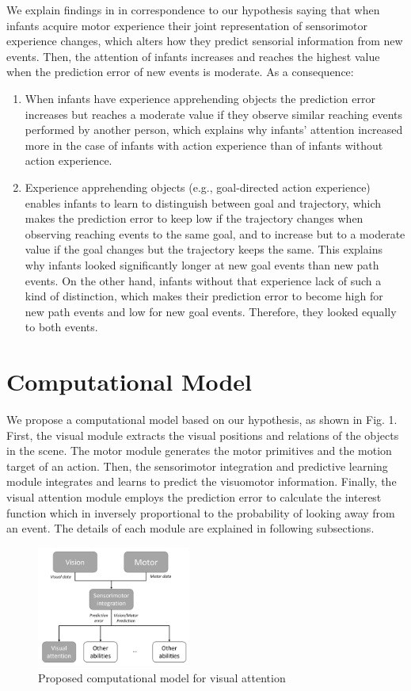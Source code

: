 \documentclass[conference]{IEEEtran}
\begin{document}
We explain findings in \cite{sommerville2005action} in correspondence to our hypothesis saying that when infants acquire motor experience their joint representation of sensorimotor experience changes, which alters how they predict sensorial information from new events. Then, the attention of infants increases and reaches the highest value when the prediction error of new events is moderate. As a consequence:

\begin{enumerate}
\item When infants have experience apprehending objects the prediction error increases but reaches a moderate value if they observe similar reaching events performed by another person, which explains why infants’ attention increased more in the case of infants with action experience than of infants without action experience.
\item Experience apprehending objects (e.g., goal-directed action experience) enables infants to learn to distinguish between goal and trajectory, which makes the prediction error to keep low if the trajectory changes when observing reaching events to the same goal, and to increase but to a moderate value if the goal changes but the trajectory keeps the same. This explains why infants looked significantly longer at new goal events than new path events. On the other hand, infants without that experience lack of such a kind of distinction, which makes their prediction error to become high for new path events and low for new goal events. Therefore, they looked equally to both events.
\end{enumerate}

\section{Computational Model}
We propose a computational model based on our hypothesis, as shown in Fig. 1. First, the visual module extracts the visual positions and relations of the objects in the scene. The motor module generates the motor primitives and the motion target of an action. Then, the sensorimotor integration and predictive learning module integrates and learns to predict the visuomotor information. Finally, the visual attention module employs the prediction error to calculate the interest function which in inversely proportional to the probability of looking away from an event. The details of each module are explained in following subsections.

\begin{figure}
\centering
\includegraphics[width=0.45\textwidth,natwidth=700,natheight=450]{Figure1.png}
\caption{Proposed computational model for visual attention}
\label{figure1}
\end{figure}
\end{document}
